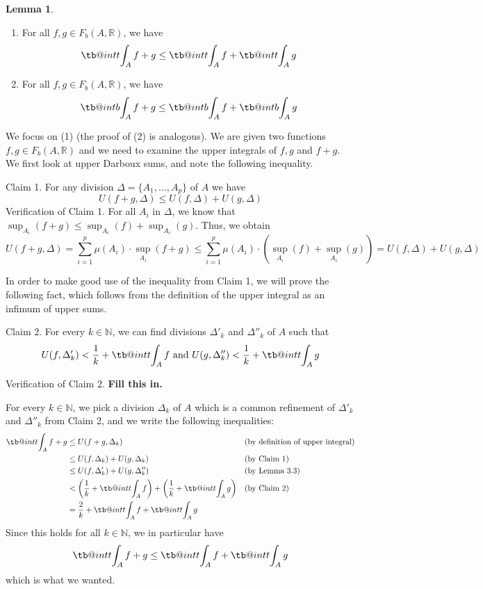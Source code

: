 \documentclass[11pt]{article}
\makeatletter
\theoremstyle{definition}
\newtheorem{lemma}[thm]{Lemma}
\newcommand{\N}{\ensuremath{\mathbb{N}}}
\newcommand{\R}{\ensuremath{\mathbb{R}}}
\newcommand\tint{\mathop{\mathpalette\tb@int{t}}\!\int}
\newcommand\bint{\mathop{\mathpalette\tb@int{b}}\!\int}
\newcommand\tb@int[2]{%
  \sbox\z@{$\m@th#1\int$}%
  \if#2t%
    \rlap{\hbox to\wd\z@{%
      \hfil
      \vrule width .35em height \dimexpr\ht\z@+1.4pt\relax depth -\dimexpr\ht\z@+1pt\relax
      \kern.05em %
    }}
  \else
    \rlap{\hbox to\wd\z@{%
      \vrule width .35em height -\dimexpr\dp\z@+1pt\relax depth \dimexpr\dp\z@+1.4pt\relax
      \hfil
    }}
  \fi
}
\newenvironment{pf}[1][\proofname]{\par
  \pushQED{\qed}%
  \normalfont \topsep0\p@\relax
  \trivlist
  \item[\hskip\labelsep\itshape
  #1\@addpunct{.}]\ignorespaces
}{%
  \popQED\endtrivlist\@endpefalse
}
\makeatother
\begin{document}
\begin{lemma}~
	\begin{enumerate}[(1)]
		\item For all $f , g \in F_b(A, \mathbb{R})$, we have
		\begin{align*}
		\tint_A f + g \leq \tint_A f + \tint_A g
		\end{align*}
		\item For all $f , g \in F_b(A, \mathbb{R})$, we have
		\begin{align*}
		\bint_A f + g \leq \bint_A f + \bint_A g
		\end{align*}
	\end{enumerate}
\end{lemma}
\begin{pf}
We focus on (1) (the proof of (2) is analogous). We are given two functions $f, g \in F_b(A, \R)$ and we need to examine the upper integrals of $f, g$ and $f+g$. We first look at upper Darboux sums, and note the following inequality.

{\sc Claim 1.} For any division $\Delta = \{A_1, \dots, A_p\}$ of $A$ we have
$$U(f + g, \Delta) \leq U(f, \Delta) + U(g, \Delta)$$
{\sc Verification of Claim 1.} For all $A_i$ in $\Delta$, we know that $\sup_{A_i}(f+g) \leq \sup_{A_i}(f) + \sup_{A_i}(g)$. Thus, we obtain
$$U(f+g, \Delta) = \sum_{i=1}^p \mu(A_i) \cdot \sup_{A_i}(f+g) \leq \sum_{i=1}^p \mu(A_i) \cdot \left( \sup_{A_i}(f) + \sup_{A_i}(g) \right) = U(f, \Delta) + U(g, \Delta)$$

In order to make good use of the inequality from Claim 1, we will prove the following fact, which follows from the definition of the upper integral as an infimum of upper sums.

{\sc Claim 2.} For every $k \in \N$, we can find divisions $\Delta'_k$ and $\Delta''_k$ of $A$ such that
$$U(f, \Delta'_k) < \frac1k + \tint_A f \text{ and } U(g, \Delta''_k) < \frac1k + \tint_A g$$

{\sc Verification of Claim 2.} {\bf Fill this in.}

For every $k \in \N$, we pick a division $\Delta_k$ of $A$ which is a common refinement of $\Delta'_k$ and $\Delta''_k$ from Claim 2, and we write the following inequalities:
\begin{align*}
    \tint_A f+g &\leq U(f+g, \Delta_k) &&\text{(by definition of upper integral)} \\
    &\leq U(f, \Delta_k) + U(g, \Delta_k) &&\text{(by Claim 1)} \\
    &\leq U(f, \Delta'_k) + U(g, \Delta''_k) &&\text{(by Lemma 3.3)} \\
    &< \left( \frac1k + \tint_A f \right) + \left( \frac1k + \tint_A g \right) &&\text{(by Claim 2)} \\
    &= \frac2k + \tint_A f + \tint_A g
\end{align*}
Since this holds for all $k \in \N$, we in particular have 
$$\tint_A f + g \leq \tint_A f + \tint_A g$$
which is what we wanted.
\end{pf}
\end{document}
